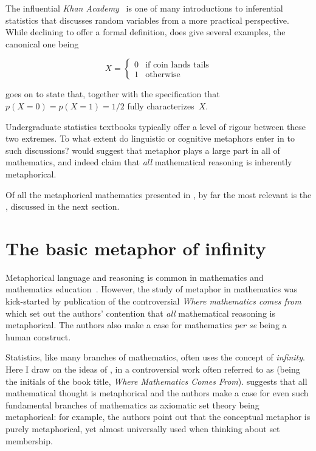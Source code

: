 The influential {\em Khan Academy}~\parencite{khan2016} is one of many
introductions to inferential statistics that discusses random
variables from a more practical perspective.  While declining to offer
a formal definition, \citeauthor{khan2016} does give several examples,
the canonical one being

\[
X = \begin{cases}
  0 &\text{if coin lands tails}\\
  1 &\text{otherwise}
\end{cases}
\]

\noindent\citeauthor{khan2016} goes on to state that, 
together with the specification that~$p(X=0) = p(X=1)=1/2$ fully
characterizes~$X$.

Undergraduate statistics textbooks typically offer a level of rigour
between these two extremes.  To what extent do linguistic or cognitive
metaphors enter in to such discussions?   would
suggest that metaphor plays a large part in all of mathematics, and
indeed claim that \emph{all} mathematical reasoning is inherently
metaphorical.

Of all the metaphorical mathematics presented in \wmcf, by far the
most relevant is the , discussed
in the next section.

\section{The basic metaphor of infinity}


Metaphorical language and reasoning is common in mathematics and
mathematics education~\parencite{pimm_metaphor_1981}.  However, the
study of metaphor in mathematics was kick-started by publication of
the controversial {\em Where mathematics comes
  from}~\parencite{lakoff2000} which set out the authors' contention
that {\em all} mathematical reasoning is metaphorical.  The authors
also make a case for mathematics {\em per se} being a human construct.

Statistics, like many branches of mathematics, often uses the concept
of \emph{infinity}.  Here I draw on the ideas of ,
in a controversial work often referred to as \dquote{\wmcf} (being the
initials of the book title, \emph{Where Mathematics Comes From}).
\wmcf suggests that all mathematical thought is metaphorical and the
authors make a case for even such fundamental branches of mathematics
as axiomatic set theory being metaphorical: for example, the authors
point out that the conceptual metaphor  is purely metaphorical, yet almost
universally used when thinking about set membership.

